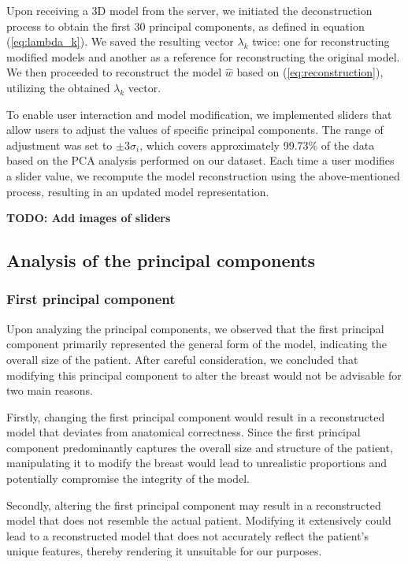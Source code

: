Upon receiving a 3D model from the server, we initiated the deconstruction process to obtain the first 30 principal components, as defined in equation (\ref{eq:lambda_k}). We saved the resulting vector 
$\lambda_k$ twice: one for reconstructing modified models and another as a reference for reconstructing the original model. We then proceeded to reconstruct the model $\hat{w}$ based on 
(\ref{eq:reconstruction}), utilizing the obtained $\lambda_k$ vector.

To enable user interaction and model modification, we implemented sliders that allow users to adjust the values of specific principal components. The range of adjustment was set to $\pm 3\sigma_i$, 
which covers approximately 99.73\% of the data based on the PCA analysis performed on our dataset. Each time a user modifies a slider value, we recompute the model reconstruction using the 
above-mentioned process, resulting in an updated model representation.

\textbf{TODO: Add images of sliders}

\subsection{Analysis of the principal components}

\subsubsection{First principal component}

Upon analyzing the principal components, we observed that the first principal component primarily represented the general form of the model, indicating the overall size of the patient. 
After careful consideration, we concluded that modifying this principal component to alter the breast would not be advisable for two main reasons.

Firstly, changing the first principal component would result in a reconstructed model that deviates from anatomical correctness. Since the first principal component predominantly captures the 
overall size and structure of the patient, manipulating it to modify the breast would lead to unrealistic proportions and potentially compromise the integrity of the model.

Secondly, altering the first principal component may result in a reconstructed model that does not resemble the actual patient. 
Modifying it extensively could lead to a reconstructed model that does not accurately reflect the patient's unique features, thereby rendering it unsuitable for our purposes.

